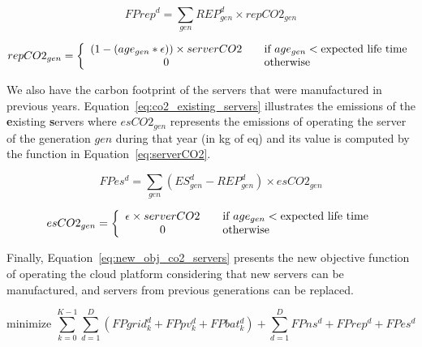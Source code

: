 \begin{equation} \label{eq:co2_rep_servers}
FPrep^d = \sum_{gen} REP_{gen}^d  \times repCO2_{gen}
\end{equation}


\begin{equation} \label{eq:amortizedCO2}
repCO2_{gen} =  \left\{ 
  \begin{array}{ c l }
    (1 - (age_{gen} * \epsilon)) \times serverCO2   & \quad \textrm{if $age_{gen}$}  <  \textrm{expected life time}      \\
    0     & \quad  \textrm{otherwise}   \\
  \end{array}
\right.
\end{equation}


We also have the carbon footprint of the servers that were manufactured in previous years. Equation~\eqref{eq:co2_existing_servers} illustrates the emissions of the \textbf{e}xisting \textbf{s}ervers where $esCO2_{gen}$ represents the emissions of operating the server of the generation $gen$ during that year (in kg of  eq) and its value is computed by the function in Equation~\eqref{eq:serverCO2}.


\begin{equation} \label{eq:co2_existing_servers}
FPes^d = \sum_{gen} ( ES_{gen}^d - REP_{gen}^d )  \times esCO2_{gen}
\end{equation}

\begin{equation} \label{eq:serverCO2}
esCO2_{gen} =  \left\{ 
  \begin{array}{ c l }
    \epsilon \times serverCO2   & \quad \textrm{if $age_{gen}$}    < \textrm{expected life time}   \\
    0     & \quad \textrm{otherwise  } \\
  \end{array}
\right.
\end{equation}


Finally, Equation~\eqref{eq:new_obj_co2_servers} presents the new objective function of operating the cloud platform considering that new servers can be manufactured, and servers from previous generations can be replaced.

\begin{equation} \label{eq:new_obj_co2_servers}
\text{minimize }\sum_{k=0}^{K-1} \sum_{d=1}^D ( FPgrid^d_k +  FPpv^d_k + FPbat^d_k) + \sum_{d=1}^D   FPns^d + FPrep^d + FPes^d 
\end{equation}

